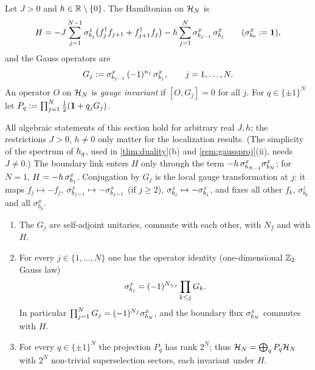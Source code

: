 \begin{definition}\label{def:model}
Let $J>0$ and $h\in\mathbb{R}\setminus\{0\}$.  The Hamiltonian on $\mathcal{H}_N$ is
\begin{equation}\label{eq:H}
  H=-J\sum_{j=1}^{N-1}\sigma^{z}_{b_{j}}\bigl(f_j^\dagger f_{j+1}+f_{j+1}^\dagger f_j\bigr)
    -h\sum_{j=1}^{N}\sigma^{x}_{b_{j-1}}\,\sigma^{x}_{b_{j}}\qquad(\sigma^{x}_{b_{0}}:=\mathbf{1}),
\end{equation}
and the Gauss operators are
\begin{equation}\label{eq:gauss}
  G_j:=\sigma^{x}_{b_{j-1}}\,(-1)^{n_j}\,\sigma^{x}_{b_{j}},\qquad j=1,\dots,N .
\end{equation}
An operator $O$ on $\mathcal{H}_N$ is \emph{gauge invariant} if $[O,G_j]=0$ for all $j$.  For
$q\in\{\pm1\}^N$ let $P_q:=\prod_{j=1}^N\frac12(\mathbf{1}+q_jG_j)$.
\end{definition}

All algebraic statements of this section hold for arbitrary real $J,h$; the restrictions $J>0$,
$h\neq0$ only matter for the localization results.  (The simplicity of the spectrum of $h_{q}$, used in
\cref{thm:duality}(b) and \cref{rem:gaussproj}(ii), needs $J\neq0$.)  The boundary link enters $H$ only through
the term $-h\,\sigma^{x}_{b_{N-1}}\sigma^{x}_{b_{N}}$; for $N=1$, $H=-h\,\sigma^{x}_{b_{1}}$.  Conjugation by $G_j$ is the local
gauge transformation at $j$: it maps $f_j\mapsto -f_j$, $\sigma^{z}_{b_{j-1}}\mapsto-\sigma^{z}_{b_{j-1}}$ (if $j\ge2$),
$\sigma^{z}_{b_{j}}\mapsto-\sigma^{z}_{b_{j}}$, and fixes all other $f_k$, $\sigma^z_{b_k}$ and all $\sigma^x_{b_k}$.

\begin{lemma}\label{lem:gauss}
\leavevmode
\begin{enumerate}[label=(\roman*)]
\item The $G_j$ are self-adjoint unitaries, commute with each other, with $N_f$ and with $H$.
\item For every $j\in\{1,\dots,N\}$ one has the operator identity (one-dimensional $\mathbb{Z}_2$ Gauss law)
\begin{equation}\label{eq:gausslaw1d}
  \sigma^{x}_{b_{j}}=(-1)^{N_{\le j}}\prod_{k\le j}G_k .
\end{equation}
In particular $\prod_{j=1}^NG_j=(-1)^{N_f}\sigma^{x}_{b_{N}}$, and the boundary flux $\sigma^{x}_{b_{N}}$ commutes with $H$.
\item For every $q\in\{\pm1\}^N$ the projection $P_q$ has rank $2^N$; thus $\mathcal{H}_N=\bigoplus_q
P_q\mathcal{H}_N$ with $2^N$ non-trivial superselection sectors, each invariant under $H$.
\end{enumerate}
\end{lemma}

